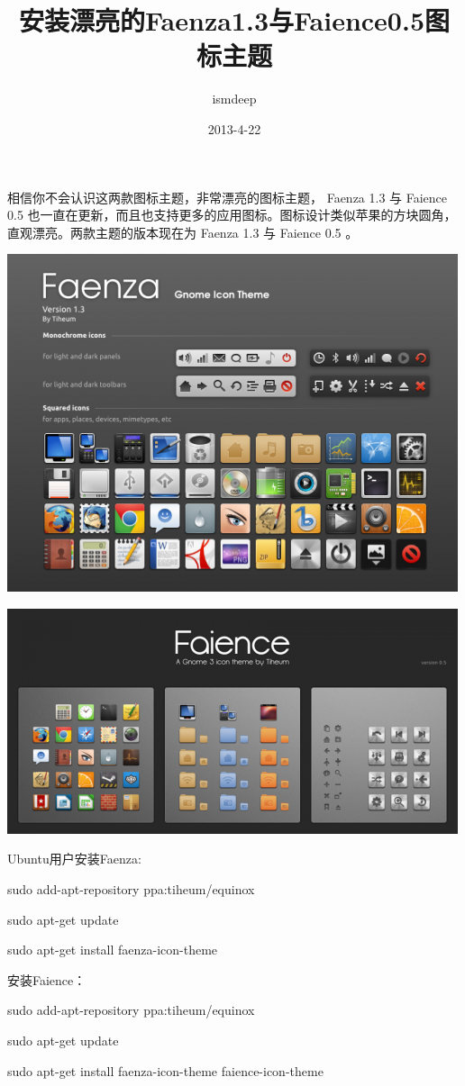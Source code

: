 \documentclass[12pt,a4paper,landscape]{article}
\begin{document}
\begin{CJK}{UTF8}{gbsn}
\title{安装漂亮的Faenza1.3与Faience0.5图标主题}
\author{ismdeep}
\date{2013-4-22}


\maketitle



相信你不会认识这两款图标主题，非常漂亮的图标主题， Faenza 1.3 与 Faience 0.5 也一直在更新，而且也支持更多的应用图标。图标设计类似苹果的方块圆角，直观漂亮。两款主题的版本现在为 Faenza 1.3 与 Faience 0.5 。


\includegraphics{2110193tcc350ztc2nkjxy.png}


\includegraphics{211019va0xxz83s3xv6utz.png}


Ubuntu用户安装Faenza:

sudo add-apt-repository ppa:tiheum/equinox

sudo apt-get update

sudo apt-get install faenza-icon-theme

安装Faience：

sudo add-apt-repository ppa:tiheum/equinox

sudo apt-get update

sudo apt-get install faenza-icon-theme faience-icon-theme 






\end{CJK}
\end{document}
